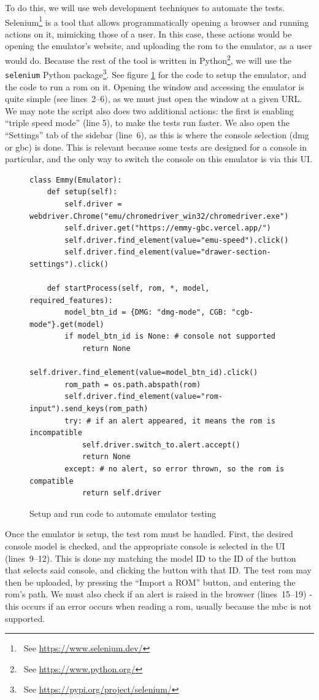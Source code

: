 \documentclass[11pt]{report}
\newcommand{\ftnt}[1]{\footnote{~See \url{#1}}}
\begin{document}
To do this, we will use web development techniques to automate the tests. Selenium\ftnt{https://www.selenium.dev/} is a tool that allows programmatically opening a browser and running actions on it, mimicking those of a user. In this case, these actions would be opening the emulator's website, and uploading the \gls{rom} to the emulator, as a user would do. Because the rest of the tool is written in Python\ftnt{https://www.python.org/}, we will use the \texttt{selenium} Python package\ftnt{https://pypi.org/project/selenium/}. See figure \ref{fig:selenium-testing} for the code to setup the emulator, and the code to run a \gls{rom} on it. Opening the window and accessing the emulator is quite simple (see lines~2--6), as we must just open the window at a given URL. We may note the script also does two additional actions: the first is enabling ``triple speed mode'' (line 5), to make the tests run faster. We also open the ``Settings'' tab of the sidebar (line~6), as this is where the console selection (\gls{dmg} or \gls{gbc}) is done. This is relevant because some tests are designed for a console in particular, and the only way to switch the console on this emulator is via this UI.

\begin{figure}[h]
    \begin{verbatim}
class Emmy(Emulator):
    def setup(self):
        self.driver = webdriver.Chrome("emu/chromedriver_win32/chromedriver.exe")
        self.driver.get("https://emmy-gbc.vercel.app/")
        self.driver.find_element(value="emu-speed").click()
        self.driver.find_element(value="drawer-section-settings").click()

    def startProcess(self, rom, *, model, required_features):
        model_btn_id = {DMG: "dmg-mode", CGB: "cgb-mode"}.get(model)
        if model_btn_id is None: # console not supported
            return None
        self.driver.find_element(value=model_btn_id).click()
        rom_path = os.path.abspath(rom)
        self.driver.find_element(value="rom-input").send_keys(rom_path)
        try: # if an alert appeared, it means the rom is incompatible
            self.driver.switch_to.alert.accept()
            return None
        except: # no alert, so error thrown, so the rom is compatible
            return self.driver
    \end{verbatim}
    \caption{Setup and run code to automate emulator testing}
    \label{fig:selenium-testing}
\end{figure}

Once the emulator is setup, the test \gls{rom} must be handled. First, the desired console model is checked, and the appropriate console is selected in the UI (lines~9--12). This is done my matching the model ID to the ID of the button that selects said console, and clicking the button with that ID. The test \gls{rom} may then be uploaded, by pressing the ``Import a ROM'' button, and entering the \gls{rom}'s path. We must also check if an alert is raised in the browser (lines~15--19) - this occurs if an error occurs when reading a \gls{rom}, usually because the \gls{mbc} is not supported.
\end{document}
